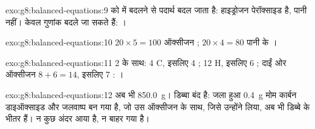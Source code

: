 \begin{solution}{exo:g8:balanced-equations:9}
 को  में बदलने से पदार्थ बदल जाता है: 
हाइड्रोजन पेरॉक्साइड है, पानी नहीं। केवल गुणांक बदले जा सकते हैं:
।
\end{solution}

\begin{solution}{exo:g8:balanced-equations:10}
$20 \times 5 = 100$ ऑक्सीजन ; $20 \times 4 = 80$ पानी के
।
\end{solution}

\begin{solution}{exo:g8:balanced-equations:11}
2  के साथ: 4 C, इसलिए 4 ; 12 H, इसलिए 6 ; दाईं
ओर ऑक्सीजन $8 + 6 = 14$, इसलिए 7 :
।
\end{solution}

\begin{solution}{exo:g8:balanced-equations:12}
अब भी \qty{850.0}{g}। डिब्बा बंद है: जला हुआ \qty{0.4}{g} मोम
कार्बन डाइऑक्साइड और जलवाष्प बन गया है, जो उस ऑक्सीजन के साथ, जिसे उन्होंने
लिया, अब भी डिब्बे के भीतर हैं। न कुछ अंदर आया है, न बाहर गया है।
\end{solution}

